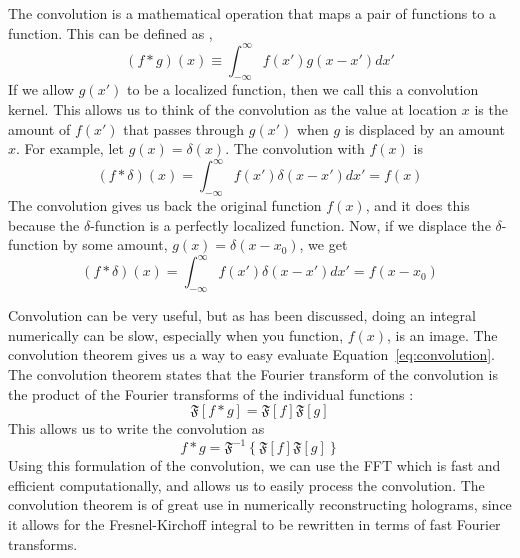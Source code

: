            The convolution is a mathematical operation that maps a pair of
            functions to a function. This can be defined as \cite{DanielSteck},
            \begin{equation}
                (f*g)(x) \equiv \int_{-\infty}^{\infty} f(x')g(x-x')dx'
                \label{eq:convolution}
            \end{equation}
            If we allow $g(x')$ to be a localized function, then we call this a
            convolution kernel.
            This allows us to think of the convolution
            as the value at location $x$ is the amount of $f(x')$ that passes
            through $g(x')$ when $g$ is displaced by an amount $x$. For example,
            let $g(x) = \delta(x)$. The convolution with $f(x)$ is
            \begin{equation}
                (f*\delta)(x)=\int_{-\infty}^{\infty}f(x')\delta(x-x')dx'=f(x)
            \end{equation}
            The convolution gives us back the original function $f(x)$, and it
            does this because the $\delta$-function is a perfectly localized
            function. Now, if we displace the $\delta$-function by some amount, $g(x)=\delta(x-x_0)$,
            we get
            \begin{equation}
                (f*\delta)(x)=\int_{-\infty}^{\infty}f(x')\delta(x-x')dx'=f(x-x_0)
            \end{equation}

            Convolution can be very useful, but as has been discussed, doing an
            integral numerically can be slow, especially when you function, $f(x)$,
            is an image. The convolution theorem gives us a way to easy evaluate
            Equation~\ref{eq:convolution}. The convolution theorem states that the
            Fourier transform of the convolution is the product of the Fourier
            transforms of the individual functions \cite{DanielSteck}:
            \begin{equation}
                \mathfrak{F}\left[ f*g
                \right]=\mathfrak{F}[f]\mathfrak{F}[g]
            \end{equation}
            This allows us to write the convolution as
            \begin{equation}
                f*g = \mathfrak{F}^{-1}\left\{\mathfrak{F}[f]\mathfrak{F}[g] \right\}
            \end{equation}
            Using this formulation of the convolution, we can use the FFT which is
            fast and efficient computationally, and allows us to easily process the
            convolution. The convolution theorem is of great use in numerically
            reconstructing holograms, since it allows for the Fresnel-Kirchoff
            integral to be rewritten in terms of fast Fourier transforms.

